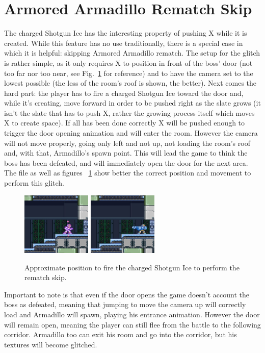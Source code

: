 \section{Armored Armadillo Rematch Skip}\label{Armadillo_skip}
The charged Shotgun Ice has the interesting property of pushing X while it is created. While this feature has no use traditionally, there is a special case in which it is helpful: skipping Armored Armadillo rematch. The setup for the glitch is rather simple, as it only requires X to position in front of the boss' door (not too far nor too near, see Fig.~\ref{Armadillo_skip_positioning} for reference) and to have the camera set to the lowest possible (the less of the room's roof is shown, the better). Next comes the hard part: the player has to fire a charged Shotgun Ice toward the door and, while it's creating, move forward in order to be pushed right as the slate grows (it isn't the slate that has to push X, rather the growing process itself which moves X to create space). If all has been done correctly X will be pushed enough to trigger the door opening animation and will enter the room. However the camera will not move properly, going only left and not up, not loading the room's roof and, with that, Armadillo's spawn point. This will lead the game to think the boss has been defeated, and will immediately open the door for the next area. The file  as well as figures ~\ref{Armadillo_skip_positioning} show better the correct position and movement to perform this glitch.
\begin{figure}[htp]
	\centering
	\includegraphics[height=3cm]{figures/X1/Miscs/Dillo_skip_1.jpg}
	\includegraphics[height=3cm]{figures/X1/Miscs/Dillo_skip_2.jpg}
	\caption{Approximate position to fire the charged Shotgun Ice to perform the rematch skip.}
	\label{Armadillo_skip_positioning}
\end{figure}
Important to note is that even if the door opens the game doesn't account the boss as defeated, meaning that jumping to move the camera up will correctly load and Armadillo will spawn, playing his entrance animation. However the door will remain open, meaning the player can still flee from the battle to the following corridor. Armadillo too can exit his room and go into the corridor, but his textures will become glitched.

